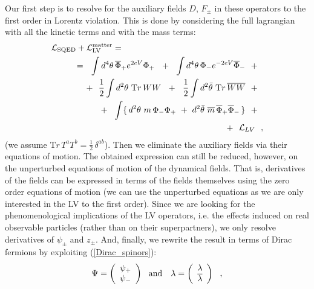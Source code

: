 \documentclass[12pt]{revtex4}
\begin{document}
Our first step is to resolve for the auxiliary fields
  $ D $, $ F_\pm $
in these operators to the first order in Lorentz 
violation.
This is done by considering the full lagrangian
with all the kinetic terms and with the mass terms:
\begin{eqnarray}
\nonumber
\lefteqn{
\mathcal{L}_{\mathrm{SQED}}  + 
\mathcal{L}_{\mathrm{LV}}^{\mathrm{matter}}
 =}  \\
\nonumber
&&
~~~~~~=~~
\int d^4\theta\, 
   \overline{\Phi}_+ e^{2eV} \Phi_+ ~~+~~
\int d^4\theta\,
   \Phi_- e^{-2eV} \overline{\Phi}_- ~~+~~ \\
\label{mass_terms}
&& 
+~~
\frac{1}{2} \int d^2\theta~
{\mathrm Tr}\, WW ~~+~~
\frac{1}{2} \int d^2\bar{\theta}~
{\mathrm Tr}\, \overline{W}\overline{W} ~~+~~ \\
\nonumber
&& 
+~~
\int \{\, d^2\theta~ m\, \Phi_-\Phi_+ ~+~
         d^2\bar{\theta}~ 
    \overline{m}\, \overline{\Phi}_+\overline{\Phi}_-\,
             \}~~+~~\\
\nonumber
&&
+~~ 
\mathcal{L}_{LV}~~,
\end{eqnarray}
(we assume $ {\mathrm Tr}\, T^a T^b = \frac{1}{2}\, \delta^{ab} $).
Then we eliminate the auxiliary fields via their equations
of motion. 
The obtained expression can still be reduced, however, on
the unperturbed equations of motion of the dynamical fields.
That is, derivatives of the fields can be expressed
in terms of the fields themselves using the zero order 
equations of motion (we can use the unperturbed equations as 
we are only interested in the LV to the first order).
Since we are looking for the phenomenological
implications of the LV operators, i.e. the effects
induced on real observable particles (rather than 
on their superpartners), we only resolve derivatives of
  $ \psi_\pm $
and
  $ z_\pm $.
And, finally, we rewrite the result in terms of Dirac
fermions by exploiting (\ref{Dirac_spinors}):
\begin{equation}
\label{app_Dirac_spinors}
   \Psi = \left ( 
                 \begin{array}{c}
                    \psi_+ \\
                    \psi_-
                 \end{array}
          \right ) ~~  {\rm and} ~~~ 
   \lambda = \left (
                 \begin{array}{c}
                    \lambda \\
                    \overline{\lambda}
                 \end{array}
             \right ) ~~,
\end{equation}
\end{document}
